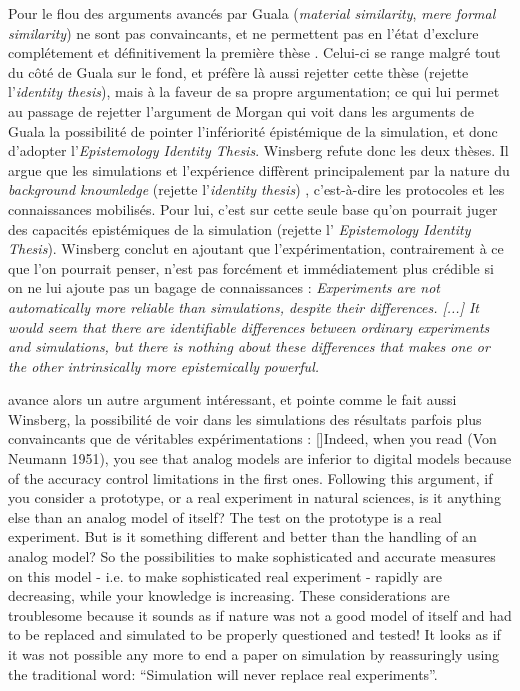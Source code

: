 Pour \textcite{Winsberg2009} le flou des arguments avancés par Guala  (\textit{material similarity}, \textit{mere formal similarity}) ne sont pas convaincants, et ne permettent pas en l'état d'exclure complétement et définitivement la première thèse . Celui-ci se range malgré tout du côté de Guala sur le fond, et préfère là aussi rejetter cette thèse (rejette l'\textit{identity thesis}), mais à la faveur de sa propre argumentation; ce qui lui permet au passage de rejetter l'argument de Morgan qui voit dans les arguments de Guala la possibilité de pointer l'infériorité épistémique de la simulation, et donc d'adopter l'\textit{Epistemology Identity Thesis}. Winsberg refute donc les deux thèses. Il argue que les simulations et l'expérience diffèrent principalement par la nature du \textit{background knownledge} (rejette l'\textit{identity thesis}) , c'est-à-dire les protocoles et les connaissances mobilisés. Pour lui, c'est sur cette seule base qu'on pourrait juger des capacités epistémiques de la simulation (rejette l' \textit{Epistemology Identity Thesis}). Winsberg conclut en ajoutant que l'expérimentation, contrairement à ce que l'on pourrait penser, n'est pas forcément et immédiatement plus crédible si on ne lui ajoute pas un bagage de connaissances : \textit{Experiments are not automatically more reliable than simulations, despite their differences. [...] It would seem that there are identifiable differences between ordinary experiments and simulations, but there is nothing about these differences that makes one or the other intrinsically more epistemically powerful.}  \autocites{Winsberg2009, Winsberg2013}

\textcite{Varenne2001} avance alors un autre argument intéressant, et pointe comme le fait aussi Winsberg, la possibilité de voir dans les simulations des résultats parfois plus convaincants que de véritables expérimentations : [\cite{Varenne2001}]{Indeed, when you read (Von Neumann 1951), you see that analog models are inferior to digital models because of the accuracy control limitations in the first ones. Following this argument, if you consider a prototype, or a real experiment in natural sciences, is it anything else than an analog model of itself? The test on the prototype is a real experiment. But is it something different and better than the handling of an analog model? So the possibilities to make sophisticated and accurate measures on this model - i.e. to make sophisticated real experiment - rapidly are decreasing, while your knowledge is increasing. These considerations are troublesome because it sounds as if nature was not a good model of itself and had to be replaced and simulated to be properly questioned and tested! It looks as if it was not possible any more to end a paper on simulation by reassuringly using the traditional word: \enquote{Simulation will never replace real experiments}. }

